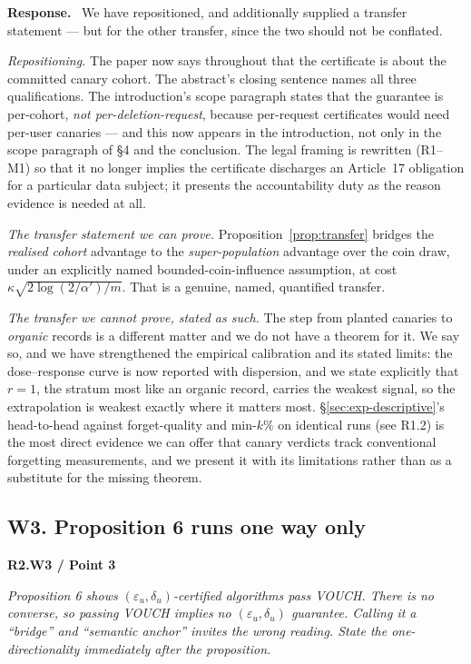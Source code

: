 \documentclass[11pt,a4paper]{article}
\newcommand{\eps}{\varepsilon}
\newenvironment{point}[1]{%
  \par\medskip\noindent\textbf{\color{rcol}#1}\par\nopagebreak\smallskip\begingroup
  \color{rcol}\itshape}{\endgroup\par}
\newenvironment{reply}{%
  \par\smallskip\noindent\textbf{\color{acol}Response.}\ \begingroup}{\endgroup\par}
\begin{document}
\begin{reply}
We have repositioned, and additionally supplied a transfer statement --- but for the
other transfer, since the two should not be conflated.

\emph{Repositioning.} The paper now says throughout that the certificate is about the
committed canary cohort. The abstract's closing sentence names all three
qualifications. The introduction's scope paragraph states that the guarantee is
per-cohort, \emph{not per-deletion-request}, because per-request certificates would need
per-user canaries --- and this now appears in the introduction, not only in the scope paragraph of \S4 and the
conclusion. The legal framing is rewritten (R1--M1) so that it no longer implies the
certificate discharges an Article~17 obligation for a particular data subject; it
presents the accountability duty as the reason evidence is needed at all.

\emph{The transfer statement we can prove.} Proposition~\ref{prop:transfer} bridges the \emph{realised
cohort} advantage to the \emph{super-population} advantage over the coin draw, under an
explicitly named bounded-coin-influence assumption, at cost
$\kappa\sqrt{2\log(2/\alpha')/m}$. That is a genuine, named, quantified transfer.

\emph{The transfer we cannot prove, stated as such.} The step from planted canaries to
\emph{organic} records is a different matter and we do not have a theorem for it. We
say so, and we have strengthened the empirical calibration and its stated limits: the
dose--response curve is now reported with dispersion, and we state explicitly that
$r=1$, the stratum most like an organic record, carries the weakest signal, so the
extrapolation is weakest exactly where it matters most. \S\ref{sec:exp-descriptive}'s head-to-head against
forget-quality and min-$k\%$ on identical runs (see R1.2) is the most direct evidence we
can offer that canary verdicts track conventional forgetting measurements, and we
present it with its limitations rather than as a substitute for the missing theorem.
\end{reply}

\subsection*{W3. Proposition 6 runs one way only}

\begin{point}{R2.W3 / Point 3}
Proposition 6 shows $(\eps_u,\delta_u)$-certified algorithms pass VOUCH. There is no
converse, so passing VOUCH implies no $(\eps_u,\delta_u)$ guarantee. Calling it a
``bridge'' and ``semantic anchor'' invites the wrong reading. State the
one-directionality immediately after the proposition.
\end{point}
\end{document}
